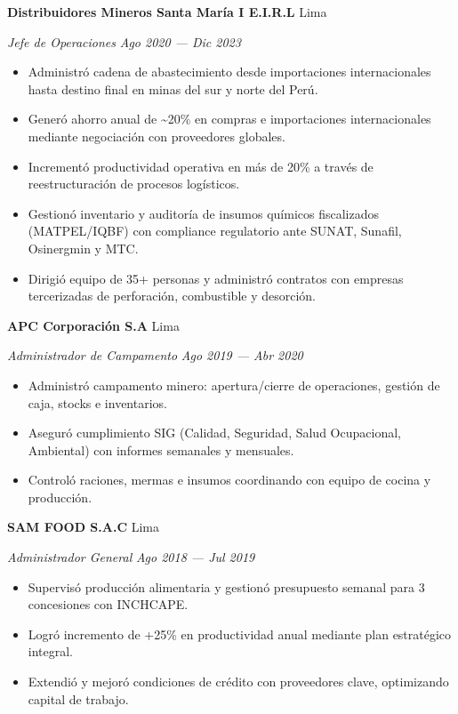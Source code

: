 \documentclass[11pt,letterpaper]{article}
\newcommand{\entry}[4]{%
  \noindent\textbf{#1} \hfill #2 \par\nopagebreak
  \textit{#3} \hfill \textit{#4} \par\nopagebreak
}
\begin{document}
\entry{Distribuidores Mineros Santa Mar\'ia I E.I.R.L}{Lima}{Jefe de Operaciones}{Ago 2020 --- Dic 2023}
\begin{itemize}
  \item Administr\'o cadena de abastecimiento desde importaciones internacionales hasta destino final en minas del sur y norte del Per\'u.
  \item Gener\'o ahorro anual de \textasciitilde{}20\% en compras e importaciones internacionales mediante negociaci\'on con proveedores globales.
  \item Increment\'o productividad operativa en m\'as de 20\% a trav\'es de reestructuraci\'on de procesos log\'isticos.
  \item Gestion\'o inventario y auditor\'ia de insumos qu\'imicos fiscalizados (MATPEL/IQBF) con compliance regulatorio ante SUNAT, Sunafil, Osinergmin y MTC.
  \item Dirigi\'o equipo de 35+ personas y administr\'o contratos con empresas tercerizadas de perforaci\'on, combustible y desorci\'on.
\end{itemize}
\vspace{0.3em}

\entry{APC Corporaci\'on S.A}{Lima}{Administrador de Campamento}{Ago 2019 --- Abr 2020}
\begin{itemize}
  \item Administr\'o campamento minero: apertura/cierre de operaciones, gesti\'on de caja, stocks e inventarios.
  \item Asegur\'o cumplimiento SIG (Calidad, Seguridad, Salud Ocupacional, Ambiental) con informes semanales y mensuales.
  \item Control\'o raciones, mermas e insumos coordinando con equipo de cocina y producci\'on.
\end{itemize}
\vspace{0.3em}

\entry{SAM FOOD S.A.C}{Lima}{Administrador General}{Ago 2018 --- Jul 2019}
\begin{itemize}
  \item Supervis\'o producci\'on alimentaria y gestion\'o presupuesto semanal para 3 concesiones con INCHCAPE.
  \item Logr\'o incremento de +25\% en productividad anual mediante plan estrat\'egico integral.
  \item Extendi\'o y mejor\'o condiciones de cr\'edito con proveedores clave, optimizando capital de trabajo.
\end{itemize}
\vspace{0.3em}
\end{document}
